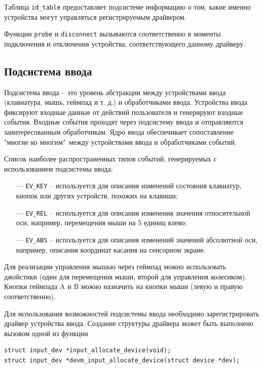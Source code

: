 Таблица \texttt{id\_table} предоставляет подсистеме информацию о том, какие именно устройства могут управляться регистрируемым драйвером.

Функции \texttt{probe} и \texttt{disconnect} вызываются соответственно в моменты подключения и отключения устройства, соответствующего данному драйверу.

\subsection{Подсистема ввода}

Подсистема ввода -- это уровень абстракции между устройствами ввода (клавиатура, мышь, геймпад и т. д.) и обработчиками ввода. Устройства ввода фиксируют входные данные от действий пользователя и генерируют входные события. Входные события проходят через подсистему ввода и отправляются заинтересованным обработчикам. Ядро ввода обеспечивает сопоставление "многие ко многим"\, между устройствами ввода и обработчиками событий.

Список наиболее распространенных типов событий, генерируемых с использованием подсистемы ввода:

\begin{itemize}[leftmargin=1.6\parindent]
    \item[---] \texttt{EV\_KEY} -- используется для описания изменений состояния клавиатур, кнопок или других устройств, похожих на клавиши;
    \item[---] \texttt{EV\_REL} -- используется для описания изменения значения относительной оси, например, перемещения мыши на 5 единиц влево;
    \item[---] \texttt{EV\_ABS} -- используется для описания изменений значений абсолютной оси, например, описания координат касания на сенсорном экране.
\end{itemize}

Для реализации управления мышью через геймпад можно использовать джойстики (один для перемещения мыши, второй для управления колесиком). Кнопки геймпада A и B можно назначить на кнопки мыши (левую и правую соответственно).

Для использования возможностей подсистемы ввода необходимо зарегистрировать драйвер устройства ввода. Создание структуры драйвера может быть выполнено вызовом одной из функции

\begin{small}
\begin{verbatim}
struct input_dev *input_allocate_device(void);
struct input_dev *devm_input_allocate_device(struct device *dev);
\end{verbatim}
\end{small}

